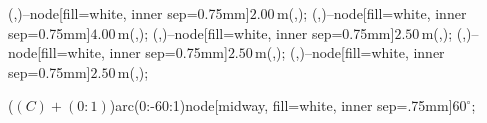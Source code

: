 {{		
		 (\dimleft,\dy)--node[fill=white, inner sep=0.75mm]{$2.00\,\text{m}$}(\dimleft,\by);
		 (\dimleft,\by)--node[fill=white, inner sep=0.75mm]{$4.00\,\text{m}$}(\dimleft,\ay);
		 (\bdx,\dimbottom)--node[fill=white, inner sep=0.75mm]{$2.50\,\text{m}$}(\ax,\dimbottom);
		 (\bdx,\dimbottom)--node[fill=white, inner sep=0.75mm]{$2.50\,\text{m}$}(\bx,\dimbottom);
		 (\bx,\dimbottom)--node[fill=white, inner sep=0.75mm]{$2.50\,\text{m}$}(\cx,\dimbottom);
	
		
		 ($(C)+(0:1)$)arc(0:-60:1)node[midway, fill=white, inner sep=.75mm]{$60^\circ$};

	}
}
